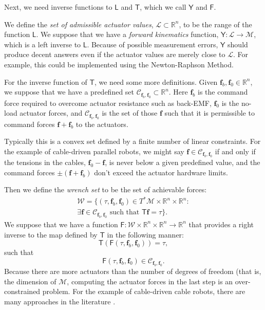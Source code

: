 \documentclass[oneside,twocolumn,reqno]{amsart}
\begin{document}
Next, we need inverse functions to $\mathsf L$ and $\mathsf T$, which we call $\mathsf Y$ and $\mathsf F$.

We define the \emph{set of admissible actuator values}, $\mathcal L \subset \mathbb R^n$, to be the range of the function $\mathsf L$.  We suppose that we have a \emph{forward kinematics} function, $\mathsf Y : \mathcal L \to \mathcal M$, which is a left inverse to $\mathsf L$.  Because of possible measurement errors, $\mathsf Y$ should produce decent answers even if the actuator values are merely close to $\mathcal L$.  For example, this could be implemented using the Newton-Raphson Method.

For the inverse function of $\mathsf T$, we need some more definitions.  Given $ \bm f_b, \bm f_0 \in \mathbb R^n$, we suppose that we have a predefined set $\mathcal C_{\bm f_b, \bm f_0} \subset \mathbb R^n$.  Here $\bm f_b$ is the command force required to overcome actuator resistance such as back-EMF, $\bm f_0$ is the no-load actuator forces, and $\mathcal C_{\bm f_b, \bm f_0}$ is the set of those $\bm f$ such that it is permissible to command forces $\bm f + \bm f_b$ to the actuators.

Typically this is a convex set defined by a finite number of linear constraints.  For the example of cable-driven parallel robots, we might say $\bm f \in \mathcal C_{\bm f_b, \bm f_0}$ if and only if the tensions in the cables, $\bm f_0 - \bm f$, is never below a given predefined value, and the command forces $\pm(\bm f + \bm f_b)$ don't exceed the actuator hardware limits.

Then we define the \emph{wrench set} to be the set of achievable forces:
\begin{multline}
\mathcal W = \{ (\tau, \bm f_b, \bm f_0) \in T^*\mathcal M \times \mathbb R^n \times \mathbb R^n: \\ \exists \bm f \in \mathcal C_{\bm f_b, \bm f_0} \text{ such that } \mathsf T \bm f = \tau\} .
\end{multline}
We suppose that we have a function $\mathsf F: \mathcal W \times \mathbb R^n \times \mathbb R^n \to \mathbb R^n$ that provides a right inverse to the map defined by $\mathsf T$ in the following manner:
\begin{equation}
\mathsf T(\mathsf F(\tau, \bm f_b, \bm f_0)) = \tau,
\end{equation}
such that
\begin{equation}
\mathsf F(\tau, \bm f_b, \bm f_0) \in \mathcal C_{\bm f_b, \bm f_0}.
\end{equation}
Because there are more actuators than the number of degrees of freedom (that is, the dimension of $\mathcal M$, computing the actuator forces in the last step is an over-constrained problem.  For the example of cable-driven cable robots, there are many approaches in the literature \cite{gould-toint,gouttefarde-et-al,pott}.
\end{document}
